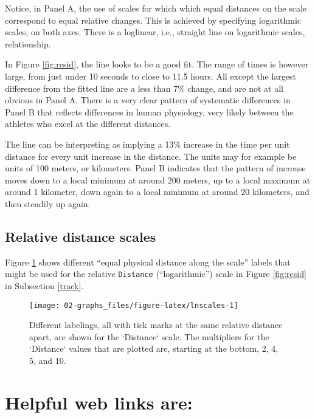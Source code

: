 \documentclass[
  10ptls,
  b5paper]{book}
\begin{document}
Notice, in Panel A, the use of scales for which which equal
distances on the scale correspond to equal relative changes.
This is achieved by specifying logarithmic scales, on both
axes. There is a loglinear, i.e., straight line on
logarithmic scales, relationship.

In Figure \ref{fig:resid}, the line looks to be a good fit.
The range of times is however large, from just under 10 seconds
to close to 11.5 hours. All except the largest difference from
the fitted line are a less than 7\% change, and are not at all
obvious in Panel A. There is a very clear pattern of systematic
differences in Panel B that reflects differences in human
physiology, very likely between the athletes who excel at the
different distances.

The line can be interpreting as implying a 13\% increase in the
time per unit distance for every unit increase in the distance.
The units may for example be units of 100 meters, or kilometers.
Panel B indicates that the pattern of increase moves down to a
local minimum at around 200 meters, up to a local maximum at
around 1 kilometer, down again to a local minimum at around 20
kilometers, and then steadily up again.

\hypertarget{relative-distance-scales}{%
\subsection*{Relative distance scales}\label{relative-distance-scales}}

Figure \ref{fig:lnscales} shows different ``equal physical
distance along the scale'' labels that might be used for the
relative \texttt{Distance} (``logarithmic'') scale in Figure
\ref{fig:resid} in Subsection \ref{track}.

\begin{figure}[H]

{\centering \texttt{[image: 02-graphs\_files/figure-latex/lnscales-1]} 

}

\caption{Different labelings, all with tick marks at the same
relative distance apart, are shown for the `Distance` scale.
The multipliers for the `Distance` values that are plotted are,
starting at the bottom, 2, 4, 5, and 10.}\label{fig:lnscales}
\end{figure}

\hypertarget{helpful-web-links-are}{%
\section{Helpful web links are:}\label{helpful-web-links-are}}
\end{document}
